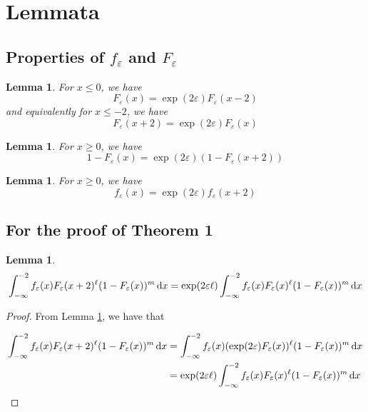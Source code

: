 \documentclass{article}
\newtheorem{lemma}[theorem]{Lemma}
\renewcommand{\epsilon}{\varepsilon}
\begin{document}
\appendix

\section{Lemmata}

\subsection{Properties of $f_\epsilon$ and $F_\epsilon$}

\begin{lemma} 
    \label{lemma:F_equality_neg}
    For $x \leq 0$, we have 
    \[F_\epsilon(x) = \exp(2\epsilon)F_\epsilon(x - 2)\]
    and equivalently for $x \leq -2$, we have 
    \[F_\epsilon(x + 2) = \exp(2\epsilon)F_\epsilon(x)\]
\end{lemma}

\begin{lemma}
    \label{lemma:F_equality_pos}
    For $x \geq 0$, we have \[1 - F_{\epsilon}(x) = \exp(2\epsilon) (1 - F_\epsilon(x + 2))\]
\end{lemma}

\begin{lemma}
    \label{lemma:f_equality}
    For $x \geq 0$, we have
    \[f_\epsilon(x) = \exp(2\epsilon) f_\epsilon(x + 2) \]
\end{lemma}

\subsection{For the proof of Theorem 1}
\begin{lemma} 
    \label{lemma:sl_tight_minus_infty} 
    \[\int_{-\infty}^{-2} f_{\epsilon}(x) F_{\epsilon}(x + 2)^\ell (1 - F_{\epsilon}(x))^m \dif x = \exp(2 \epsilon \ell) \int_{-\infty}^{-2} f_{\epsilon}(x) F_{\epsilon}(x)^\ell (1 - F_{\epsilon}(x))^m \dif x\]
\end{lemma}

\begin{proof}
    From Lemma \ref{lemma:F_equality_neg}, we have that 

    \begin{align*}
        \int_{-\infty}^{-2} f_{\epsilon}(x) F_{\epsilon}(x + 2)^\ell (1 - F_{\epsilon}(x))^m \dif x &= \int_{-\infty}^{-2} f_{\epsilon}(x) (\exp(2\epsilon) F_{\epsilon}(x))^\ell (1 - F_{\epsilon}(x))^m \dif x \\
        &= \exp(2\epsilon \ell) \int_{-\infty}^{-2} f_{\epsilon}(x) F_{\epsilon}(x)^\ell (1 - F_{\epsilon}(x))^m \dif x
    \end{align*}
\end{proof}
\end{document}

